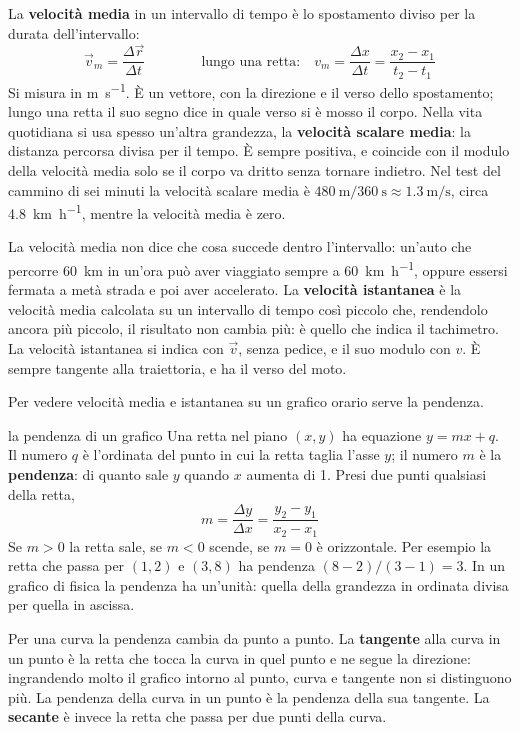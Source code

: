 La \textbf{velocità media} in un intervallo di tempo è lo spostamento diviso per la durata dell'intervallo:
\[
  \vec v_m = \frac{\Delta\vec r}{\Delta t} \qquad\qquad \text{lungo una retta:}\quad v_m = \frac{\Delta x}{\Delta t} = \frac{x_2 - x_1}{t_2 - t_1}
\]
Si misura in \si{\metre\per\second}. È un vettore, con la direzione e il verso dello spostamento; lungo una retta il suo segno dice in quale verso si è mosso il corpo. Nella vita quotidiana si usa spesso un'altra grandezza, la \textbf{velocità scalare media}: la distanza percorsa divisa per il tempo. È sempre positiva, e coincide con il modulo della velocità media solo se il corpo va dritto senza tornare indietro. Nel test del cammino di sei minuti la velocità scalare media è $\SI{480}{\metre} / \SI{360}{\second} \approx \SI{1,3}{\metre\per\second}$, circa \SI{4,8}{\kilo\metre\per\hour}, mentre la velocità media è zero.

La velocità media non dice che cosa succede dentro l'intervallo: un'auto che percorre \SI{60}{\kilo\metre} in un'ora può aver viaggiato sempre a \SI{60}{\kilo\metre\per\hour}, oppure essersi fermata a metà strada e poi aver accelerato. La \textbf{velocità istantanea} è la velocità media calcolata su un intervallo di tempo così piccolo che, rendendolo ancora più piccolo, il risultato non cambia più: è quello che indica il tachimetro. La velocità istantanea si indica con $\vec v$, senza pedice, e il suo modulo con $v$. È sempre tangente alla traiettoria, e ha il verso del moto.

Per vedere velocità media e istantanea su un grafico orario serve la pendenza.

\begin{richiamo}{la pendenza di un grafico}
Una retta nel piano $(x, y)$ ha equazione $y = mx + q$. Il numero $q$ è l'ordinata del punto in cui la retta taglia l'asse $y$; il numero $m$ è la \textbf{pendenza}: di quanto sale $y$ quando $x$ aumenta di 1. Presi due punti qualsiasi della retta,
\[
  m = \frac{\Delta y}{\Delta x} = \frac{y_2 - y_1}{x_2 - x_1}
\]
Se $m > 0$ la retta sale, se $m < 0$ scende, se $m = 0$ è orizzontale. Per esempio la retta che passa per $(1, 2)$ e $(3, 8)$ ha pendenza $(8 - 2)/(3 - 1) = 3$. In un grafico di fisica la pendenza ha un'unità: quella della grandezza in ordinata divisa per quella in ascissa.

Per una curva la pendenza cambia da punto a punto. La \textbf{tangente} alla curva in un punto è la retta che tocca la curva in quel punto e ne segue la direzione: ingrandendo molto il grafico intorno al punto, curva e tangente non si distinguono più. La pendenza della curva in un punto è la pendenza della sua tangente. La \textbf{secante} è invece la retta che passa per due punti della curva.
\end{richiamo}

